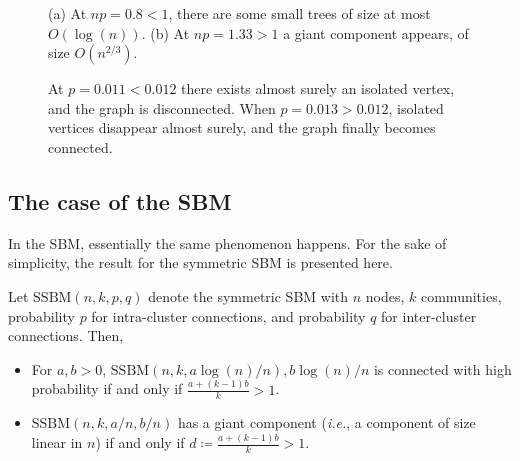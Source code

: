 \documentclass[../../main.tex]{subfiles} %
\begin{document}
\begin{figure}
	\centering
	\begin{subfigure}{.55\textwidth}
		\centering
		\caption{}
		\label{fig:er-giant-0}
	\end{subfigure}
	\hfill
	\begin{subfigure}{.55\textwidth}
		\centering
		\caption{}
		\label{fig:er-giant-1}
	\end{subfigure}
	\caption{(a) At \(np = 0.8 < 1\), there are some small trees of size at 
		most \(O(\log(n))\). (b) At \(np = 1.33 > 1\) a giant component 
		appears, of 
		size \(O(n^{2/3})\).}
	\label{fig:test1}
\end{figure}

\begin{figure}
	\centering
	\caption{At \(p = 0.011 < 0.012\) there exists almost surely an 
		isolated vertex, and the graph is disconnected. When \(p = 0.013 > 
		0.012\), isolated vertices disappear almost surely, and the graph 
		finally becomes connected.}
	\label{fig:er-connectivity-0}
\end{figure}

\subsection{The case of the SBM}  %
In the SBM, essentially the same phenomenon happens. For the sake of simplicity, 
the result for the symmetric SBM is presented here.
\begin{proposition}
	Let \(\text{SSBM}(n, k, p, q)\) denote the symmetric SBM with \(n\) nodes, \(k\) 
	communities, probability \(p\) for intra-cluster connections, and probability \(q\) 
	for inter-cluster connections. Then,
	\begin{itemize}
		\item For \(a, b > 0\), \(\text{SSBM}(n, k, a \log(n)/n), b \log(n)/n\) is 
		connected with high probability if and only if \(\frac{a + (k-1)b}{k} > 1\).
		\item \(\text{SSBM}(n, k, a/n, b/n)\) has a giant component (\textit{i.e.}, a 
		component of size linear in \(n\)) if and only if \(d \coloneqq \frac{a + 
		(k-1)b}{k} > 1\).
	\end{itemize}
\end{proposition}
\end{document}
